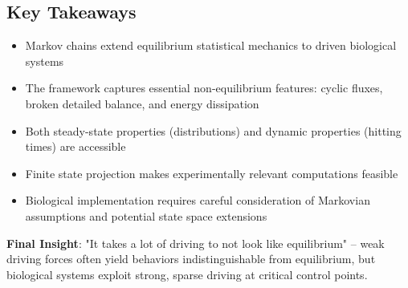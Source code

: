 \documentclass[12pt]{article}
\begin{document}
\subsection{Key Takeaways}

\begin{itemize}
    \item Markov chains extend equilibrium statistical mechanics to driven biological systems
    \item The framework captures essential non-equilibrium features: cyclic fluxes, broken detailed balance, and energy dissipation
    \item Both steady-state properties (distributions) and dynamic properties (hitting times) are accessible
    \item Finite state projection makes experimentally relevant computations feasible
    \item Biological implementation requires careful consideration of Markovian assumptions and potential state space extensions
\end{itemize}

\textbf{Final Insight}: "It takes a lot of driving to not look like equilibrium" -- weak driving forces often yield behaviors indistinguishable from equilibrium, but biological systems exploit strong, sparse driving at critical control points.
\end{document}
